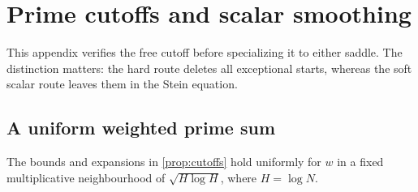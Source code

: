 \section{Prime cutoffs and scalar smoothing}\label{supp:sec:cutoffs}
This appendix verifies the free cutoff before specializing it to either
saddle. The distinction matters: the hard route deletes all exceptional
starts, whereas the soft scalar route leaves them in the Stein equation.

\subsection{A uniform weighted prime sum}
\begin{proposition}
\label{supp:prop:cutoff-calculation}
The bounds and expansions in \cref{prop:cutoffs} hold uniformly for $w$
in a fixed multiplicative neighbourhood of $\sqrt{H\log H}$,
where $H=\log N$.
\end{proposition}

